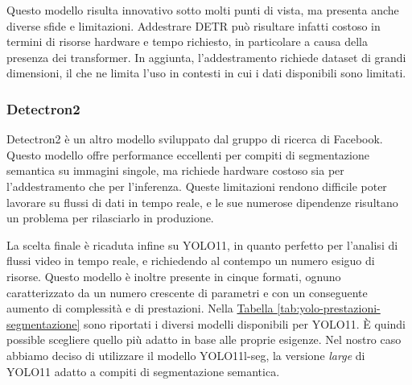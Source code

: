 \documentclass[12pt]{report}
\begin{document}
Questo modello risulta innovativo sotto molti punti di vista, ma presenta anche diverse sfide e limitazioni. Addestrare DETR può risultare infatti costoso in termini di risorse hardware e tempo richiesto, in particolare a causa della presenza dei transformer. In aggiunta, l'addestramento richiede dataset di grandi dimensioni, il che ne limita l'uso in contesti in cui i dati disponibili sono limitati.

\subsubsection{Detectron2}
\label{sec:detectron}

Detectron2 è un altro modello sviluppato dal gruppo di ricerca di Facebook. Questo modello offre performance eccellenti per compiti di segmentazione semantica su immagini singole, ma richiede hardware costoso sia per l'addestramento che per l'inferenza. Queste limitazioni rendono difficile poter lavorare su flussi di dati in tempo reale, e le sue numerose dipendenze risultano un problema per rilasciarlo in produzione.

\vspace{10pt}

La scelta finale è ricaduta infine su YOLO11, in quanto perfetto per l'analisi di flussi video in tempo reale, e richiedendo al contempo un numero esiguo di risorse. Questo modello è inoltre presente in cinque formati, ognuno caratterizzato da un numero crescente di parametri e con un conseguente aumento di complessità e di prestazioni. Nella \hyperref[tab:yolo-prestazioni-segmentazione]{Tabella \ref{tab:yolo-prestazioni-segmentazione}} sono riportati i diversi modelli disponibili per YOLO11. È quindi possible scegliere quello più adatto in base alle proprie esigenze. Nel nostro caso abbiamo deciso di utilizzare il modello YOLO11l-seg, la versione \textit{large} di YOLO11 adatto a compiti di segmentazione semantica.
\end{document}

